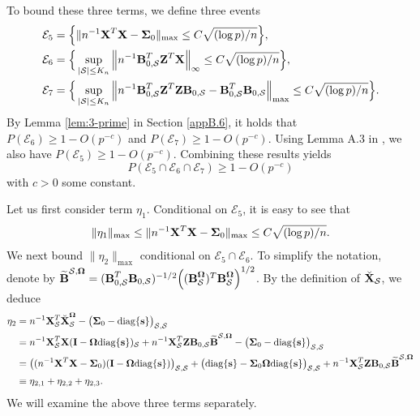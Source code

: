 \documentclass[11pt]{article}
\newcommand{\bs}{\mbox{\bf s}}
\newcommand{\bB}{\mbox{\bf B}}
\newcommand{\bI}{\mbox{\bf I}}
\newcommand{\bX}{\mbox{\bf X}}
\newcommand{\bZ}{\mbox{\bf Z}}
\newcommand{\bSig}{\mbox{\boldmath $\Sigma$}}
\newcommand{\bOmg}{\mbox{\boldmath $\Omega$}}
\newcommand{\sbOmg}{\mbox{\scriptsize\boldmath $\Omega$}}
\newcommand{\diag}{\mathrm{diag}}
\begin{document}
To bound these three terms, we define three events
\begin{align*}
\mathcal{E}_5 & =
\Big\{ \| n^{-1} \bX^{T}\bX - \bSig_{0} \|_{\max}
\leq C \sqrt{(\log p)/n} \Big\}, \\
\mathcal{E}_6 & =
\Big\{ \sup_{|\mathcal S| \leq K_n} \Big\| n^{-1} \bB_{0,\mathcal{S}}^T\bZ^T\bX\Big\|_{\infty} \leq C\sqrt{(\log p)/n} \Big\}, \\
\mathcal{E}_7 & =
\Big\{ \sup_{|\mathcal S| \leq K_n}
\Big\| n^{-1} \bB_{0,\mathcal{S}}^T\bZ^T \bZ \bB_{0,\mathcal{S}} - \bB_{0,\mathcal{S}}^T \bB_{0,\mathcal{S}} \Big\|_{\max}
\leq C \sqrt{(\log p)/n} \Big\}.
\end{align*}
By Lemma \ref{lem:3-prime} in Section \ref{appB.6}, it holds that $ P( \mathcal{E}_6 ) \geq 1 - O(p^{-c}) $ and $ P( \mathcal{E}_7 ) \geq 1 - O(p^{-c}) $.
Using Lemma A.3 in \cite{Bickel2008}, we also have $ P( \mathcal{E}_5 ) \geq 1 - O(p^{-c}) $.
Combining these results yields
\[ P( \mathcal{E}_5 \cap \mathcal{E}_6 \cap \mathcal{E}_7) \geq 1 - O(p^{-c}) \]
with $c > 0$ some constant.

Let us first consider term $\eta_{1}$. Conditional on $\mathcal{E}_5$, it is easy to see that
\begin{align} \label{eqn:eta1}
\| \eta_{1} \|_{\max} \leq \| n^{-1} \bX^{T}\bX - \bSig_{0} \|_{\max}
\leq C \sqrt{(\log p)/n}.
\end{align}
We next bound $\| \eta_{2} \|_{\max} $ conditional on $\mathcal{E}_5 \cap \mathcal{E}_6$.
To simplify the notation, denote by $\widetilde{\bB}^{\mathcal{S}, \sbOmg} = (\bB_{0,\mathcal{S}}^T\bB_{0,\mathcal{S}})^{-1/2} \Big(({\bB}_{\mathcal S}^{\sbOmg})^T{\bB}_{\mathcal S}^{\sbOmg}\Big)^{1/2}
$. By the definition of $\breve{\bX}_{\mathcal S}$,
we deduce
\begin{align*}
\eta_{2}
& =
n^{-1} \bX_{\mathcal S}^{T}\breve{\bX}_{\mathcal S}^{\sbOmg}
- \big(\bSig_0 - \diag\{\bs\}\big)_{\mathcal{S},\mathcal{S}}
\\
& =
n^{-1} \bX_{\mathcal S}^{T} \bX( \bI- \bOmg\diag\{\bs\})_{\mathcal S} + n^{-1} \bX_{\mathcal S}^{T} \bZ\bB_{0,\mathcal{S}}\widetilde{\bB}^{\mathcal{S}, \sbOmg}
- \big(\bSig_0 - \diag\{\bs\}\big)_{\mathcal{S},\mathcal{S}}
\\
& =
\big( ( n^{-1} \bX^{T} \bX - \bSig_0 )
( \bI - \bOmg\diag\{\bs\})
\big)_{\mathcal{S},\mathcal{S}}
+
\big( \diag\{\bs\} - \bSig_0 \bOmg\diag\{\bs\} \big)_{\mathcal{S},\mathcal{S}}
+
n^{-1} \bX_{\mathcal S}^{T} \bZ\bB_{0,\mathcal{S}}\widetilde{\bB}^{\mathcal{S}, \sbOmg}
\\
& \equiv \eta_{2,1} + \eta_{2,2} + \eta_{2,3}.
\end{align*}
We will examine the above three terms separately.
\end{document}
